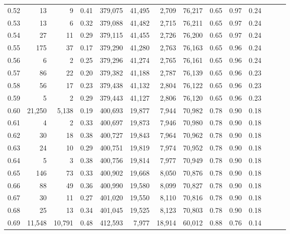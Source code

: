 \begin{tabular}{rrrrrrrrrrrrrr}
0.52 &      13 &       9 &  0.41 &  379,075 &   41,495 &   2,709 &  76,217 &  0.65 &  0.97 &      0.24 \\
0.53 &      13 &       6 &  0.32 &  379,088 &   41,482 &   2,715 &  76,211 &  0.65 &  0.97 &      0.24 \\
0.54 &      27 &      11 &  0.29 &  379,115 &   41,455 &   2,726 &  76,200 &  0.65 &  0.97 &      0.24 \\
0.55 &     175 &      37 &  0.17 &  379,290 &   41,280 &   2,763 &  76,163 &  0.65 &  0.96 &      0.24 \\
0.56 &       6 &       2 &  0.25 &  379,296 &   41,274 &   2,765 &  76,161 &  0.65 &  0.96 &      0.24 \\
0.57 &      86 &      22 &  0.20 &  379,382 &   41,188 &   2,787 &  76,139 &  0.65 &  0.96 &      0.23 \\
0.58 &      56 &      17 &  0.23 &  379,438 &   41,132 &   2,804 &  76,122 &  0.65 &  0.96 &      0.23 \\
0.59 &       5 &       2 &  0.29 &  379,443 &   41,127 &   2,806 &  76,120 &  0.65 &  0.96 &      0.23 \\
0.60 &  21,250 &   5,138 &  0.19 &  400,693 &   19,877 &   7,944 &  70,982 &  0.78 &  0.90 &      0.18 \\
0.61 &       4 &       2 &  0.33 &  400,697 &   19,873 &   7,946 &  70,980 &  0.78 &  0.90 &      0.18 \\
0.62 &      30 &      18 &  0.38 &  400,727 &   19,843 &   7,964 &  70,962 &  0.78 &  0.90 &      0.18 \\
0.63 &      24 &      10 &  0.29 &  400,751 &   19,819 &   7,974 &  70,952 &  0.78 &  0.90 &      0.18 \\
0.64 &       5 &       3 &  0.38 &  400,756 &   19,814 &   7,977 &  70,949 &  0.78 &  0.90 &      0.18 \\
0.65 &     146 &      73 &  0.33 &  400,902 &   19,668 &   8,050 &  70,876 &  0.78 &  0.90 &      0.18 \\
0.66 &      88 &      49 &  0.36 &  400,990 &   19,580 &   8,099 &  70,827 &  0.78 &  0.90 &      0.18 \\
0.67 &      30 &      11 &  0.27 &  401,020 &   19,550 &   8,110 &  70,816 &  0.78 &  0.90 &      0.18 \\
0.68 &      25 &      13 &  0.34 &  401,045 &   19,525 &   8,123 &  70,803 &  0.78 &  0.90 &      0.18 \\
0.69 &  11,548 &  10,791 &  0.48 &  412,593 &    7,977 &  18,914 &  60,012 &  0.88 &  0.76 &      0.14 \\

\end{tabular}
